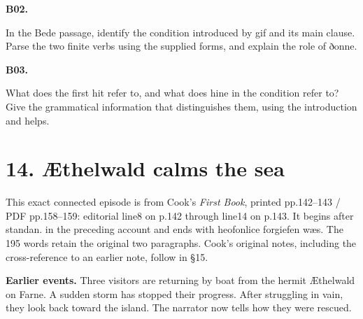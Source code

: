 \par\begin{minipage}{\linewidth}\raggedright
\textbf{B02.}

In the Bede passage, identify the condition introduced by gif and its main clause. Parse the two finite verbs using the supplied forms, and explain the role of ðonne.

\end{minipage}\par\addvspace{4pt}

\par\begin{minipage}{\linewidth}\raggedright
\textbf{B03.}

What does the first hit refer to, and what does hine in the condition refer to? Give the grammatical information that distinguishes them, using the introduction and helps.

\end{minipage}\par\addvspace{4pt}

\section*{14. Æthelwald calms the sea}

This exact connected episode is from Cook’s \emph{First Book}, printed pp.142–143 /\allowbreak{} PDF pp.158–159: editorial line8 on p.142 through line14 on p.143. It begins after standan. in the preceding account and ends with heofonlice forgiefen wæs. The 195 words retain the original two paragraphs. Cook’s original notes, including the cross-reference to an earlier note, follow in §15.

\textbf{Earlier events.} Three visitors are returning by boat from the hermit Æthelwald on Farne. A sudden storm has stopped their progress. After struggling in vain, they look back toward the island. The narrator now tells how they were rescued.


